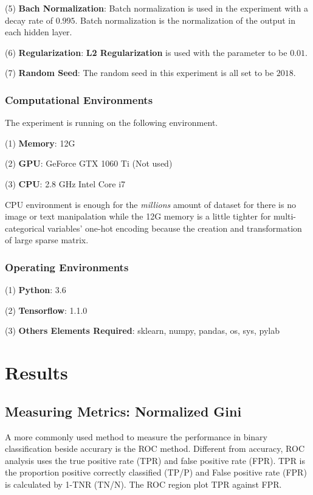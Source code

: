 \documentclass{article}
\begin{document}
    (5) \textbf{Bach Normalization}:
    Batch normalization is used in the experiment with a decay rate of $0.995$. Batch normalization is the normalization of the output in each hidden layer.
    
    (6) \textbf{Regularization}:
    \textbf{L2 Regularization} is used with the parameter to be $0.01$.
    
    (7) \textbf{Random Seed}: 
    The random seed in this experiment is all set to be $2018$.

    \subsubsection{Computational Environments}
    The experiment is running on the following environment. 

    (1) \textbf{Memory}: 12G

    (2) \textbf{GPU}: GeForce GTX 1060 Ti (Not used)

    (3) \textbf{CPU}: 2.8 GHz Intel Core i7

    CPU environment is enough for the \emph{millions} amount of dataset for there is no image or text manipalation while the 12G memory is a little tighter for multi-categorical variables' one-hot encoding because the creation and transformation of large sparse matrix.

    \subsubsection{Operating Environments}

    (1) \textbf{Python}: 3.6

    (2) \textbf{Tensorflow}: 1.1.0

    (3) \textbf{Others Elements Required}: sklearn, numpy, pandas, os, sys, pylab

    \newpage
    \section{Results}
 
    \subsection{Measuring Metrics: Normalized Gini}

    A more commonly used method to measure the performance in binary classification beside accurary is the ROC method. Different from accuracy, ROC analysis uses the true positive rate (TPR) and false positive rate (FPR). TPR is the proportion positive correctly classified (TP/P) and  False positive rate (FPR) is calculated by 1-TNR (TN/N). The ROC region plot TPR against FPR.~\cite{gini}
\end{document}
